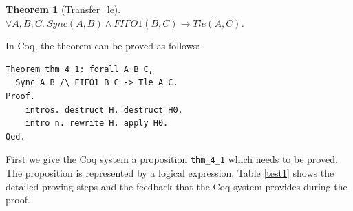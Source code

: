 \documentclass[preprint,3p]{elsarticle}
\newtheorem{theorem}{Theorem}[section]
\begin{document}
\begin{theorem}[Transfer\_le]\label{the:tleac}
$\forall A,B,C.\:Sync(A,B)\land FIFO1(B,C) \rightarrow Tle(A,C)$.
\end{theorem}

In Coq, the theorem can be proved as follows:
\begin{lstlisting}[language=coq]
Theorem thm_4_1: forall A B C,
  Sync A B /\ FIFO1 B C -> Tle A C.
Proof.
    intros. destruct H. destruct H0.
    intro n. rewrite H. apply H0.
Qed.
\end{lstlisting}

First we give the Coq system a proposition
\texttt{thm\_4\_1} which needs to be proved. The proposition is represented by a logical expression.
Table \ref{test1} shows the detailed proving steps and the feedback that the Coq system provides during the proof.
\end{document}
